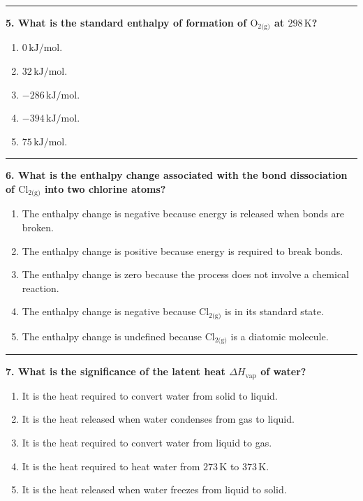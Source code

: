 \documentclass[
  9pt,
]{extbook}
\providecommand{\tightlist}{%
  \setlength{\itemsep}{0pt}\setlength{\parskip}{0pt}}
\theoremstyle{definition}
\theoremstyle{definition}
\theoremstyle{definition}
\theoremstyle{remark}
\begin{document}
\begin{center}\rule{0.5\linewidth}{0.5pt}\end{center}

\textbf{5. What is the standard enthalpy of formation of \(\text{O}_{2\text{(g)}}\) at \(298\,\text{K}\)?}

\begin{enumerate}
\def\labelenumi{\alph{enumi}.}
\tightlist
\item
  \(0\,\text{kJ/mol}\).
\item
  \(32\,\text{kJ/mol}\).
\item
  \(-286\,\text{kJ/mol}\).
\item
  \(-394\,\text{kJ/mol}\).
\item
  \(75\,\text{kJ/mol}\).
\end{enumerate}

\begin{center}\rule{0.5\linewidth}{0.5pt}\end{center}

\textbf{6. What is the enthalpy change associated with the bond dissociation of \(\text{Cl}_{2\text{(g)}}\) into two chlorine atoms?}

\begin{enumerate}
\def\labelenumi{\alph{enumi}.}
\tightlist
\item
  The enthalpy change is negative because energy is released when bonds are broken.
\item
  The enthalpy change is positive because energy is required to break bonds.
\item
  The enthalpy change is zero because the process does not involve a chemical reaction.
\item
  The enthalpy change is negative because \(\text{Cl}_{2\text{(g)}}\) is in its standard state.
\item
  The enthalpy change is undefined because \(\text{Cl}_{2\text{(g)}}\) is a diatomic molecule.
\end{enumerate}

\begin{center}\rule{0.5\linewidth}{0.5pt}\end{center}

\textbf{7. What is the significance of the latent heat \(\Delta H_{\text{vap}}\) of water?}

\begin{enumerate}
\def\labelenumi{\alph{enumi}.}
\tightlist
\item
  It is the heat required to convert water from solid to liquid.
\item
  It is the heat released when water condenses from gas to liquid.
\item
  It is the heat required to convert water from liquid to gas.
\item
  It is the heat required to heat water from \(273\,\text{K}\) to \(373 \,\text{K}\).
\item
  It is the heat released when water freezes from liquid to solid.
\end{enumerate}
\end{document}
